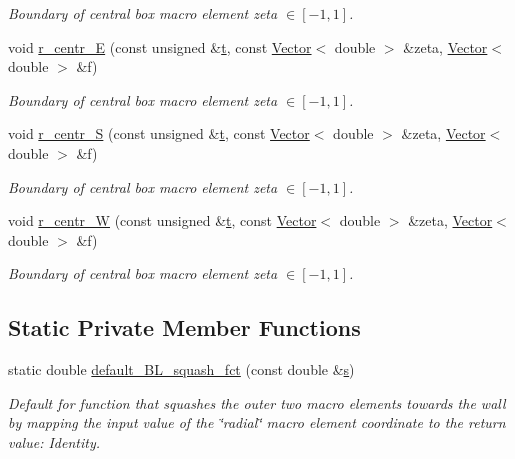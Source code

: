 \begin{DoxyCompactItemize}
\begin{DoxyCompactList}\small\item\em Boundary of central box macro element zeta $ \in [-1,1] $. \end{DoxyCompactList}\item 
void \hyperlink{classoomph_1_1QuarterCircleSectorDomain_ae4558d37a4f9bb3f9d78b6878cb77a49}{r\+\_\+centr\+\_\+E} (const unsigned \&\hyperlink{cfortran_8h_af6f0bd3dc13317f895c91323c25c2b8f}{t}, const \hyperlink{classoomph_1_1Vector}{Vector}$<$ double $>$ \&zeta, \hyperlink{classoomph_1_1Vector}{Vector}$<$ double $>$ \&f)
\begin{DoxyCompactList}\small\item\em Boundary of central box macro element zeta $ \in [-1,1] $. \end{DoxyCompactList}\item 
void \hyperlink{classoomph_1_1QuarterCircleSectorDomain_aaa17ff1d6529000f8309005396966830}{r\+\_\+centr\+\_\+S} (const unsigned \&\hyperlink{cfortran_8h_af6f0bd3dc13317f895c91323c25c2b8f}{t}, const \hyperlink{classoomph_1_1Vector}{Vector}$<$ double $>$ \&zeta, \hyperlink{classoomph_1_1Vector}{Vector}$<$ double $>$ \&f)
\begin{DoxyCompactList}\small\item\em Boundary of central box macro element zeta $ \in [-1,1] $. \end{DoxyCompactList}\item 
void \hyperlink{classoomph_1_1QuarterCircleSectorDomain_a453fc6f043f57031c1347065d521a1c3}{r\+\_\+centr\+\_\+W} (const unsigned \&\hyperlink{cfortran_8h_af6f0bd3dc13317f895c91323c25c2b8f}{t}, const \hyperlink{classoomph_1_1Vector}{Vector}$<$ double $>$ \&zeta, \hyperlink{classoomph_1_1Vector}{Vector}$<$ double $>$ \&f)
\begin{DoxyCompactList}\small\item\em Boundary of central box macro element zeta $ \in [-1,1] $. \end{DoxyCompactList}\end{DoxyCompactItemize}
\subsection*{Static Private Member Functions}
\begin{DoxyCompactItemize}
\item 
static double \hyperlink{classoomph_1_1QuarterCircleSectorDomain_adce1f0c6cf5405d6f8e9e6e0390d8c68}{default\+\_\+\+B\+L\+\_\+squash\+\_\+fct} (const double \&\hyperlink{cfortran_8h_ab7123126e4885ef647dd9c6e3807a21c}{s})
\begin{DoxyCompactList}\small\item\em Default for function that squashes the outer two macro elements towards the wall by mapping the input value of the \char`\"{}radial\char`\"{} macro element coordinate to the return value\+: Identity. \end{DoxyCompactList}\end{DoxyCompactItemize}
